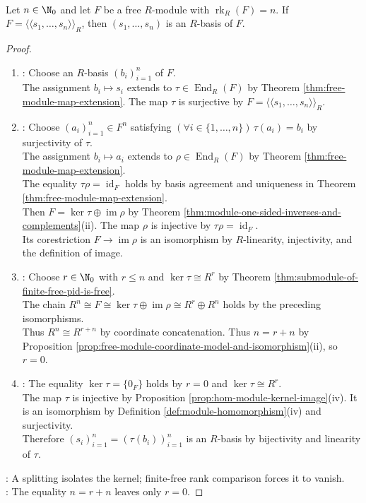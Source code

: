 \begin{proposition} \label{prop:spanning-set-size-rank-basis-pid} \\
Let $n\in\N_0$ and let $F$ be a free $R$-module with $\operatorname{rk}_R(F)=n$. If $F=\langle\!\langle s_1,\ldots,s_n\rangle\!\rangle_R$, then $(s_1,\ldots,s_n)$ is an $R$-basis of $F$.
\begin{proof}
\begin{enumerate}[label=(\roman*)]
\setlength{\itemsep}{0pt}
\item {}: Choose an $R$-basis $(b_i)_{i=1}^n$ of $F$.\\
The assignment $b_i\mapsto s_i$ extends to $\tau\in\operatorname{End}_R(F)$ by Theorem \ref{thm:free-module-map-extension}. The map $\tau$ is surjective by $F=\langle\!\langle s_1,\ldots,s_n\rangle\!\rangle_R$.
\item {}: Choose $(a_i)_{i=1}^n\in F^n$ satisfying $(\forall i\in\{1,\ldots,n\})\,\tau(a_i)=b_i$ by surjectivity of $\tau$.\\
The assignment $b_i\mapsto a_i$ extends to $\rho\in\operatorname{End}_R(F)$ by Theorem \ref{thm:free-module-map-extension}.\\
The equality $\tau\rho=\operatorname{id}_F$ holds by basis agreement and uniqueness in Theorem \ref{thm:free-module-map-extension}.\\
Then $F=\ker\tau\oplus\operatorname{im}\rho$ by Theorem \ref{thm:module-one-sided-inverses-and-complements}(ii). The map $\rho$ is injective by $\tau\rho=\operatorname{id}_F$.\\
Its corestriction $F\to\operatorname{im}\rho$ is an isomorphism by $R$-linearity, injectivity, and the definition of image.
\item {}: Choose $r\in\N_0$ with $r\leq n$ and $\ker\tau\cong R^r$ by Theorem \ref{thm:submodule-of-finite-free-pid-is-free}.\\
The chain $R^n\cong F\cong\ker\tau\oplus\operatorname{im}\rho\cong R^r\oplus R^n$ holds by the preceding isomorphisms.\\
Thus $R^n\cong R^{r+n}$ by coordinate concatenation. Thus $n=r+n$ by Proposition \ref{prop:free-module-coordinate-model-and-isomorphism}(ii), so $r=0$.
\item {}: The equality $\ker\tau=\{0_F\}$ holds by $r=0$ and $\ker\tau\cong R^r$.\\
The map $\tau$ is injective by Proposition \ref{prop:hom-module-kernel-image}(iv). It is an isomorphism by Definition \ref{def:module-homomorphism}(iv) and surjectivity.\\
Therefore $(s_i)_{i=1}^n=(\tau(b_i))_{i=1}^n$ is an $R$-basis by bijectivity and linearity of $\tau$.
\end{enumerate}
: A splitting isolates the kernel; finite-free rank comparison forces it to vanish.\\
: The equality $n=r+n$ leaves only $r=0$.
\end{proof}
\end{proposition}
